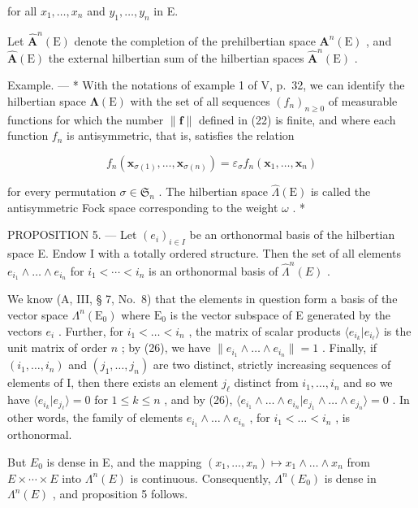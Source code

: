 for all \(x_{1},\ldots ,x_{n}\) and \(y_{1},\ldots ,y_{n}\) in E.

Let \(\hat{\mathbf{A}}^n (\mathrm{E})\) denote the completion of the prehilbertian space \(\mathbf{A}^n (\mathrm{E})\) , and \(\hat{\mathbf{A}} (\mathrm{E})\) the external hilbertian sum of the hilbertian spaces \(\hat{\mathbf{A}}^n (\mathrm{E})\) .

Example. --- * With the notations of example 1 of V, p.~32, we can identify the hilbertian space \(\symbf{\Lambda}(\mathrm{E})\) with the set of all sequences \((f_n)_{n\geqslant 0}\) of measurable functions for which the number \(\| \mathbf{f}\|\) defined in (22) is finite, and where each function \(f_{n}\) is antisymmetric, that is, satisfies the relation

\[
f _ {n} (\mathbf {x} _ {\sigma (1)}, \dots , \mathbf {x} _ {\sigma (n)}) = \varepsilon_ {\sigma} f _ {n} (\mathbf {x} _ {1}, \dots , \mathbf {x} _ {n})
\]

for every permutation \(\sigma \in \mathfrak{S}_n\) . The hilbertian space \(\hat{\Lambda}(\mathrm{E})\) is called the antisymmetric Fock space corresponding to the weight \(\omega\) . *

PROPOSITION 5. --- Let \((e_i)_{i \in I}\) be an orthonormal basis of the hilbertian space E. Endow I with a totally ordered structure. Then the set of all elements \(e_{i_1} \wedge \ldots \wedge e_{i_n}\) for \(i_1 < \cdots < i_n\) is an orthonormal basis of \(\hat{\Lambda}^n(E)\) .

We know (A, III, § 7, No.~8) that the elements in question form a basis of the vector space \(\Lambda^n (\mathrm{E}_0)\) where \(\mathrm{E}_0\) is the vector subspace of E generated by the vectors \(e_i\) . Further, for \(i_1 < \dots < i_n\) , the matrix of scalar products \(\langle e_{i_k}|e_{i_\ell}\rangle\) is the unit matrix of order \(n\) ; by (26), we have \(\| e_{i_1}\wedge \ldots \wedge e_{i_n}\| = 1\) . Finally, if \((i_1,\dots,i_n)\) and \((j_1,\dots,j_n)\) are two distinct, strictly increasing sequences of elements of I, then there exists an element \(j_\ell\) distinct from \(i_1,\ldots ,i_n\) and so we have \(\langle e_{i_k}|e_{j_\ell}\rangle = 0\) for \(1\leqslant k\leqslant n\) , and by (26), \(\langle e_{i_1}\wedge \ldots \wedge e_{i_n}|e_{j_1}\wedge \ldots \wedge e_{j_n}\rangle = 0\) . In other words, the family of elements \(e_{i_1}\wedge \ldots \wedge e_{i_n}\) , for \(i_1 < \dots < i_n\) , is orthonormal.

But \(E_{0}\) is dense in E, and the mapping \((x_{1},...,x_{n})\mapsto x_{1}\wedge\ldots\wedge x_{n}\) from \(E\times\cdots\times E\) into \(\Lambda^{n}(E)\) is continuous. Consequently, \(\Lambda^{n}(E_{0})\) is dense in \(\Lambda^{n}(E)\) , and proposition 5 follows.

